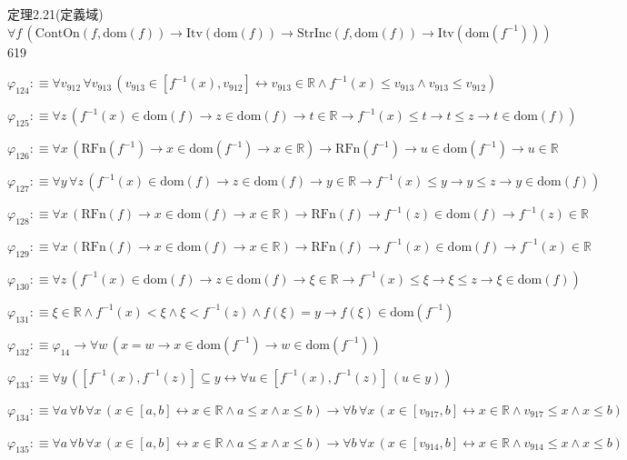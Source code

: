 \begin{fullproof}{定理2.21(定義域)}{$\forall f\,(\mathrm{ContOn}(f,\mathrm{dom}(f)) \to \mathrm{Itv}(\mathrm{dom}(f)) \to \mathrm{StrInc}(f,\mathrm{dom}(f)) \to \mathrm{Itv}(\mathrm{dom}(f^{-1})))$}{619}
\begin{abbrevlist}
\item $\varphi_{124} :\equiv \forall v_{912}\,\forall v_{913}\,(v_{913} \in [f^{-1}(x),v_{912}] \leftrightarrow v_{913} \in \mathbb{R} \land f^{-1}(x) \leq v_{913} \land v_{913} \leq v_{912})$
\item $\varphi_{125} :\equiv \forall z\,(f^{-1}(x) \in \mathrm{dom}(f) \to z \in \mathrm{dom}(f) \to t \in \mathbb{R} \to f^{-1}(x) \leq t \to t \leq z \to t \in \mathrm{dom}(f))$
\item $\varphi_{126} :\equiv \forall x\,(\mathrm{RFn}(f^{-1}) \to x \in \mathrm{dom}(f^{-1}) \to x \in \mathbb{R}) \to \mathrm{RFn}(f^{-1}) \to u \in \mathrm{dom}(f^{-1}) \to u \in \mathbb{R}$
\item $\varphi_{127} :\equiv \forall y\,\forall z\,(f^{-1}(x) \in \mathrm{dom}(f) \to z \in \mathrm{dom}(f) \to y \in \mathbb{R} \to f^{-1}(x) \leq y \to y \leq z \to y \in \mathrm{dom}(f))$
\item $\varphi_{128} :\equiv \forall x\,(\mathrm{RFn}(f) \to x \in \mathrm{dom}(f) \to x \in \mathbb{R}) \to \mathrm{RFn}(f) \to f^{-1}(z) \in \mathrm{dom}(f) \to f^{-1}(z) \in \mathbb{R}$
\item $\varphi_{129} :\equiv \forall x\,(\mathrm{RFn}(f) \to x \in \mathrm{dom}(f) \to x \in \mathbb{R}) \to \mathrm{RFn}(f) \to f^{-1}(x) \in \mathrm{dom}(f) \to f^{-1}(x) \in \mathbb{R}$
\item $\varphi_{130} :\equiv \forall z\,(f^{-1}(x) \in \mathrm{dom}(f) \to z \in \mathrm{dom}(f) \to \xi \in \mathbb{R} \to f^{-1}(x) \leq \xi \to \xi \leq z \to \xi \in \mathrm{dom}(f))$
\item $\varphi_{131} :\equiv \xi \in \mathbb{R} \land f^{-1}(x) < \xi \land \xi < f^{-1}(z) \land f(\xi) = y \to f(\xi) \in \mathrm{dom}(f^{-1})$
\item $\varphi_{132} :\equiv \varphi_{14} \to \forall w\,(x = w \to x \in \mathrm{dom}(f^{-1}) \to w \in \mathrm{dom}(f^{-1}))$
\item $\varphi_{133} :\equiv \forall y\,([f^{-1}(x),f^{-1}(z)] \subseteq y \leftrightarrow \forall u \in [f^{-1}(x),f^{-1}(z)]\,(u \in y))$
\item $\varphi_{134} :\equiv \forall a\,\forall b\,\forall x\,(x \in [a,b] \leftrightarrow x \in \mathbb{R} \land a \leq x \land x \leq b) \to \forall b\,\forall x\,(x \in [v_{917},b] \leftrightarrow x \in \mathbb{R} \land v_{917} \leq x \land x \leq b)$
\item $\varphi_{135} :\equiv \forall a\,\forall b\,\forall x\,(x \in [a,b] \leftrightarrow x \in \mathbb{R} \land a \leq x \land x \leq b) \to \forall b\,\forall x\,(x \in [v_{914},b] \leftrightarrow x \in \mathbb{R} \land v_{914} \leq x \land x \leq b)$

\end{abbrevlist}
\end{fullproof}
